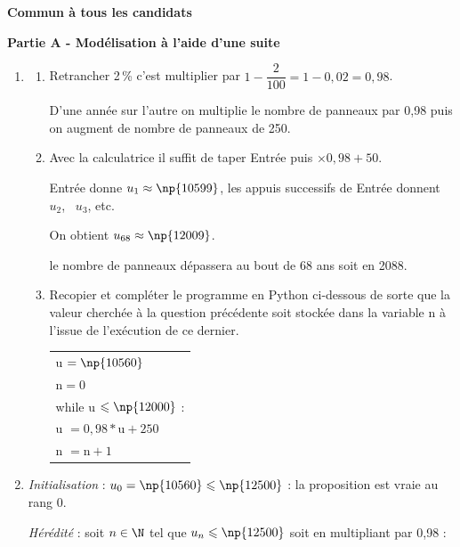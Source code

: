 \textbf{Commun à tous les candidats}

\medskip







\textbf{Partie A - Modélisation à l'aide d'une suite}

\medskip



\medskip

\begin{enumerate}
\item 
	\begin{enumerate}
		\item  
Retrancher 2\,\% c'est multiplier par $1 - \dfrac{2}{100} = 1 - 0,02 = 0,98$.

D'une année sur l'autre on multiplie le nombre de panneaux par 0,98 puis on augment de nombre de panneaux de 250.
		\item  
		

Avec la calculatrice il suffit de taper  Entrée puis $\times 0,98 + 50$.

Entrée donne $u_1 \approx \np{10599}$, les appuis successifs de Entrée donnent $u_2$, \, $u_3$, etc.

On obtient $u_{68} \approx \np{12009}$.

le nombre de panneaux dépassera  au bout de 68 ans soit en 2088.
		\item  Recopier et compléter le programme en Python ci-dessous de sorte que la valeur
cherchée à la question précédente soit stockée dans la variable n à l'issue de l'exécution de ce dernier.
\begin{center}
\begin{tabular}{|l|}\hline
u $= \np{10560}$\\
n$ =0$\\
while  u $\leqslant \np{12000}$ :\\
\qquad u $= 0,98*\text{u} + 250$  \\
\qquad n $= \text{n} + 1$\\ \hline
\end{tabular}
\end{center}

	\end{enumerate}
\item 
\emph{Initialisation }: $u_0 = \np{10560} \leqslant \np{12500}$ : la proposition est vraie au rang 0.

\emph{Hérédité} : soit $n \in \N$ tel que $u_n \leqslant \np{12500}$ soit en multipliant par 0,98 :


\end{enumerate}

